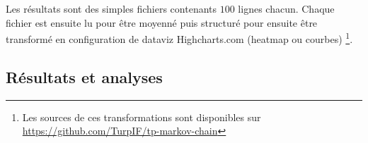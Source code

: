 \documentclass[10pt, a4paper]{article}
\begin{document}
Les résultats sont des simples fichiers contenants $100$ lignes chacun. Chaque
fichier est ensuite lu pour être moyenné puis structuré pour ensuite être
transformé en configuration de dataviz Highcharts.com (heatmap ou courbes)
\footnote{Les sources de ces transformations sont disponibles sur
\url{https://github.com/TurpIF/tp-markov-chain}}. \\

\subsection{Résultats et analyses}
\end{document}
